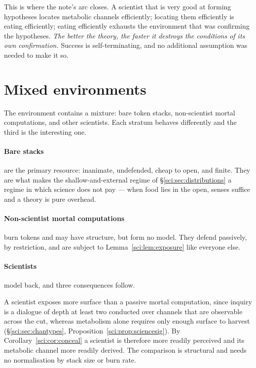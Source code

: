 This is where the note's arc closes. A scientist that is very good at forming hypotheses locates
metabolic channels efficiently; locating them efficiently is eating efficiently; eating efficiently
exhausts the environment that was confirming the hypotheses. \emph{The better the theory, the faster
it destroys the conditions of its own confirmation.} Success is self-terminating, and no additional
assumption was needed to make it so.

\section{Mixed environments}\label{sci:S10}
\label{sci:sec:mixed}

The environment contains a mixture: bare token stacks, non-scientist mortal computations, and other
scientists. Each stratum behaves differently and the third is the interesting one.

\paragraph{Bare stacks} are the primary resource: inanimate, undefended, cheap to open, and finite.
They are what makes the shallow-and-external regime of \S\ref{sci:sec:distributions} a regime in which
science does not pay --- when food lies in the open, senses suffice and a theory is pure overhead.

\paragraph{Non-scientist mortal computations} burn tokens and may have structure, but form no model.
They defend passively, by restriction, and are subject to Lemma~\ref{sci:lem:exposure} like everyone else.

\paragraph{Scientists} model back, and three consequences follow.

\begin{proposition}
\label{sci:prop:preferredprey}
A scientist exposes more surface than a passive mortal computation, since inquiry is a dialogue of
depth at least two conducted over channels that are observable across the cut, whereas metabolism
alone requires only enough surface to harvest (\S\ref{sci:sec:chantypes},
Proposition~\ref{sci:prop:sciencesig}). By Corollary~\ref{sci:cor:conceal} a scientist is therefore more
readily perceived and its metabolic channel more readily derived. The comparison is structural and
needs no normalisation by stack size or burn rate.
\end{proposition}

